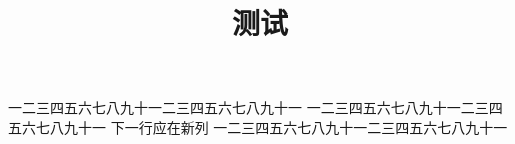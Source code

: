 \documentclass{ltc-guji-digital}
\title{测试}
\begin{document}
\begin{正文}
一二三四五六七八九十一二三四五六七八九十一
一二三四五六七八九十一二三四五六七八九十一
下一行应在新列
一二三四五六七八九十一二三四五六七八九十一
\end{正文}
\end{document}

